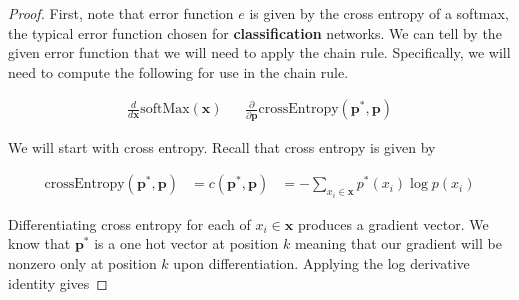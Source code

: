 \documentclass[11pt]{article}
\newcommand{\pd}{\partial}
\newcommand{\bs}{\boldsymbol}
\begin{document}
\begin{proof}
	First, note that error function $e$ is given by the cross entropy of a
	softmax, the typical error function chosen for \textbf{classification}
	networks. We can tell by the given error function that we will need to
	apply the chain rule.
	Specifically, we will need to compute the following for use in the chain
	rule.

	\begin{align}
		\frac{d}{d \bs{x}} \text{softMax}(\bs{x})
		&&
		\frac{\pd}{\pd \bs{p}} \text{crossEntropy}(\bs{p}^*, \bs{p})
	\end{align}

	We will start with cross entropy. Recall that cross entropy is given by

	\begin{align}
		\text{crossEntropy}(\boldsymbol{p}^*, \boldsymbol{p})
		&=
		c(\boldsymbol{p}^*, \boldsymbol{p})
		&=
		-\sum_{x_i\in\boldsymbol{x}} p^*(x_i) \log p(x_i)
	\end{align}

	Differentiating cross entropy for each of $x_i \in \bs{x}$ produces a
	gradient vector. We know that $\bs{p}^*$ is a one hot vector at position
	$k$ meaning that our gradient will be nonzero only at position $k$ upon
	differentiation. Applying the log derivative identity gives


\end{proof}
\end{document}
